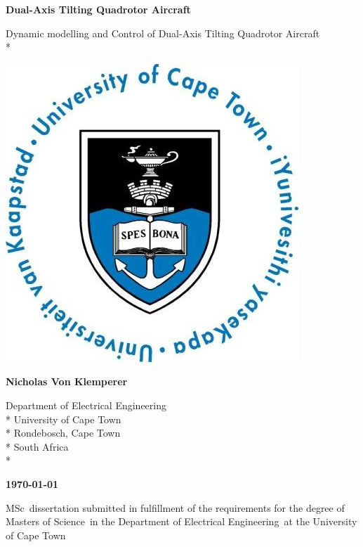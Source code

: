 \documentclass[a4paper, 11pt, oneside, openright, parskip=full]{book}
\newcommand{\auth}{Nicholas Von Klemperer}								%
\newcommand{\titl}{Dual-Axis Tilting Quadrotor Aircraft}						%
\newcommand{\subtitle}{Dynamic modelling and Control of Dual-Axis Tilting Quadrotor Aircraft}						%
\newcommand{\dept}{Department of Electrical Engineering}%
\newcommand{\uni}{University of Cape Town}				%
\newcommand{\city}{Rondebosch, Cape Town}				%
\newcommand{\country}{South Africa}						%
\newcommand{\degre}{Masters of Science}				%
\newcommand{\degreeabv}{MSc}							%
\newcommand{\supervisor}{Supervisor}					%
\newcommand{\logo}										%
{	
	\includegraphics[scale = 0.3]{figs/uctLogo}
}
\begin{document}
\setcounter{MaxMatrixCols}{20}
\begin{titlepage}
	\centering
	\vspace*{1cm}

	\begin{Huge}					
		\bfseries\titl\par
		\vskip 5mm
	\end{Huge}
	\begin{Large}					
		\subtitle\\*
		\vskip 3cm
	\end{Large}
	\logo							
	\vskip 1.5cm	
	\begin{Large}					
		\bfseries\auth\\
	\end{Large}
	\begin{normalsize}				
		\vskip 2mm	
		\dept\\*
		\uni\\*
		\city\\*
		\country\\*
		
		\vskip 15mm	
	\end{normalsize}
	\begin{Large}					
		{\bfseries \mydate\today}
		\vskip 15mm	
	\end{Large}
		\degreeabv\ dissertation submitted in fulfillment of the requirements for the degree of \degre\ in the \dept\ at the \uni
		

\end{titlepage}
\end{document}
